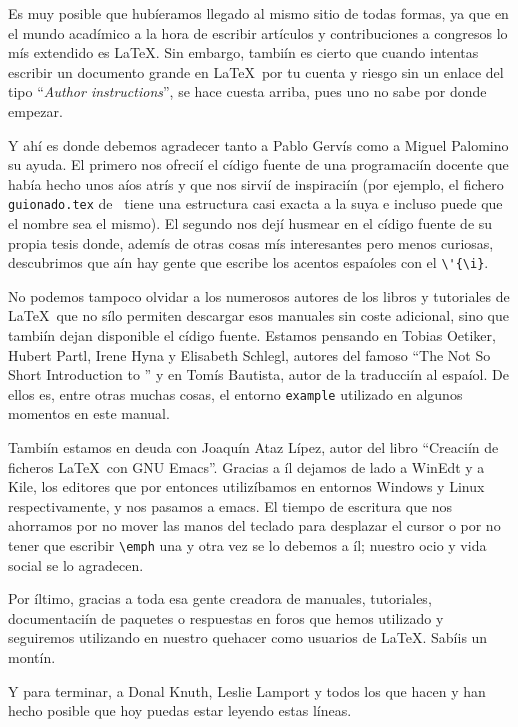 Es muy posible que hubíeramos llegado al mismo sitio de todas formas,
ya que en el mundo acadímico a la hora de escribir artículos y
contribuciones a congresos lo mís extendido es \LaTeX. Sin embargo,
tambiín es cierto que cuando intentas escribir un documento grande
en \LaTeX\ por tu cuenta y riesgo sin un enlace del tipo ``\emph{Author
  instructions}'', se hace cuesta arriba, pues uno no sabe por donde
empezar.

Y ahí es donde debemos agradecer tanto a Pablo Gervís como a Miguel
Palomino su ayuda. El primero nos ofrecií el cídigo fuente de una
programaciín docente que había hecho unos aíos atrís y que nos sirvií
de inspiraciín (por ejemplo, el fichero \texttt{guionado.tex} de
\texis\ tiene una estructura casi exacta a la suya e incluso puede
que el nombre sea el mismo). El segundo nos dejí husmear en el cídigo
fuente de su propia tesis donde, ademís de otras cosas mís
interesantes pero menos curiosas, descubrimos que aín hay gente que
escribe los acentos espaíoles con el \verb+\'{\i}+.

No podemos tampoco olvidar a los numerosos autores de los libros y
tutoriales de \LaTeX\ que no sílo permiten descargar esos manuales sin
coste adicional, sino que tambiín dejan disponible el cídigo fuente.
Estamos pensando en Tobias Oetiker, Hubert Partl, Irene Hyna y
Elisabeth Schlegl, autores del famoso ``The Not So Short Introduction
to \LaTeXe'' y en Tomís Bautista, autor de la traducciín al espaíol. De
ellos es, entre otras muchas cosas, el entorno \texttt{example}
utilizado en algunos momentos en este manual.

Tambiín estamos en deuda con Joaquín Ataz Lípez, autor del libro
``Creaciín de ficheros \LaTeX\ con {GNU} Emacs''. Gracias a íl dejamos
de lado a WinEdt y a Kile, los editores que por entonces utilizíbamos
en entornos Windows y Linux respectivamente, y nos pasamos a emacs. El
tiempo de escritura que nos ahorramos por no mover las manos del
teclado para desplazar el cursor o por no tener que escribir
\verb+\emph+ una y otra vez se lo debemos a íl; nuestro ocio y vida
social se lo agradecen.

Por íltimo, gracias a toda esa gente creadora de manuales, tutoriales,
documentaciín de paquetes o respuestas en foros que hemos utilizado y
seguiremos utilizando en nuestro quehacer como usuarios de
\LaTeX. Sabíis un montín.

Y para terminar, a Donal Knuth, Leslie Lamport y todos los que hacen y
han hecho posible que hoy puedas estar leyendo estas líneas.

\endinput
